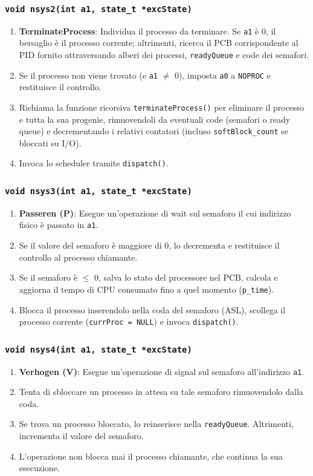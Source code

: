 \documentclass[a4paper,12pt]{article}
\begin{document}
\subsubsection{\texttt{void nsys2(int a1, state\_t *excState)}}
\begin{enumerate}
    \item \textbf{TerminateProcess}: Individua il processo da terminare. Se \texttt{a1} è 0, il bersaglio è il processo corrente; altrimenti, ricerca il PCB corrispondente al PID fornito attraversando alberi dei processi, \texttt{readyQueue} e code dei semafori.
    \item Se il processo non viene trovato (e \texttt{a1} $\ne$ 0), imposta \texttt{a0} a \texttt{NOPROC} e restituisce il controllo.
    \item Richiama la funzione ricorsiva \texttt{terminateProcess()} per eliminare il processo e tutta la sua progenie, rimuovendoli da eventuali code (semafori o ready queue) e decrementando i relativi contatori (incluso \texttt{softBlock\_count} se bloccati su I/O).
    \item Invoca lo scheduler tramite \texttt{dispatch()}.
\end{enumerate}

\subsubsection{\texttt{void nsys3(int a1, state\_t *excState)}}
\begin{enumerate}
    \item \textbf{Passeren (P)}: Esegue un'operazione di wait sul semaforo il cui indirizzo fisico è passato in \texttt{a1}.
    \item Se il valore del semaforo è maggiore di 0, lo decrementa e restituisce il controllo al processo chiamante.
    \item Se il semaforo è $\le$ 0, salva lo stato del processore nel PCB, calcola e aggiorna il tempo di CPU consumato fino a quel momento (\texttt{p\_time}).
    \item Blocca il processo inserendolo nella coda del semaforo (ASL), scollega il processo corrente (\texttt{currProc = NULL}) e invoca \texttt{dispatch()}.
\end{enumerate}

\subsubsection{\texttt{void nsys4(int a1, state\_t *excState)}}
\begin{enumerate}
    \item \textbf{Verhogen (V)}: Esegue un'operazione di signal sul semaforo all'indirizzo \texttt{a1}.
    \item Tenta di sbloccare un processo in attesa su tale semaforo rimuovendolo dalla coda.
    \item Se trova un processo bloccato, lo reinserisce nella \texttt{readyQueue}. Altrimenti, incrementa il valore del semaforo.
    \item L'operazione non blocca mai il processo chiamante, che continua la sua esecuzione.
\end{enumerate}
\end{document}
